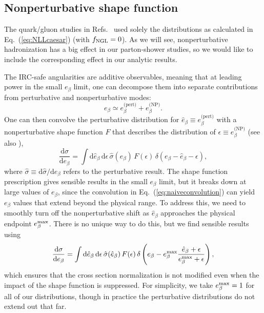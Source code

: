 \documentclass[11pt,letterpaper]{article}
\newcommand{\df}{\text{d}}
\DeclareRobustCommand{\Eq}[1]{Eq.~(\ref{#1})}
\DeclareRobustCommand{\Refs}[1]{Refs.~\cite{#1}}
\newcommand{\be}{\begin{equation}}
\newcommand{\ee}{\end{equation}}
\begin{document}
\subsection{Nonperturbative shape function}
\label{subsec:shapefuncdef}

The quark/gluon studies in \Refs{Larkoski:2013eya,Larkoski:2014pca} used solely the distributions as calculated in \Eq{eq:NLLcaesar} (with $f_{\rm NGL} = 0$).  As we will see, nonperturbative hadronization has a big effect in our parton-shower studies, so we would like to include the corresponding effect in our analytic results.

The IRC-safe angularities are additive observables, meaning that at leading power in the small $e_\beta$ limit, one can decompose them into separate contributions from perturbative and nonperturbative modes:
\be
e_\beta \simeq e_\beta^{\text{(pert)}} + e_\beta^{\text{(NP)}}.
\ee
One can then convolve the perturbative distribution for $\hat{e}_\beta \equiv e_\beta^{\text{(pert)}}$ with a nonperturbative shape function $F$ that describes the distribution of $\epsilon \equiv e_\beta^{\text{(NP)}}$ \cite{Korchemsky:1999kt, Korchemsky:2000kp} (see also \cite{Manohar:1994kq, Dokshitzer:1995zt, Salam:2001bd, Lee:2006nr, Mateu:2012nk}),
\be
\label{eq:naiveconvolution}
\frac{\df \sigma}{\df e_\beta} = \int \df \hat{e}_\beta \, \df \epsilon \,  \hat{\sigma}(\hat{e}_\beta) \, F(\epsilon) \, \delta\left(e_\beta - \hat{e}_\beta - \epsilon\right),
\ee
where $\hat{\sigma} \equiv \df \hat{\sigma}/\df \hat{e}_\beta$ refers to the perturbative result.  The shape function prescription gives sensible results in the small $e_\beta$ limit, but it breaks down at large values of $e_\beta$, since the convolution in \Eq{eq:naiveconvolution} can yield $e_\beta$ values that extend beyond the physical range.  To address this, we need to smoothly turn off the nonperturbative shift as $\hat{e}_\beta$ approaches the physical endpoint $e_\beta^{\rm max}$.  There is no unique way to do this, but we find sensible results using
\be
\label{eq:physicalconvolution}
\frac{\df \sigma}{\df e_\beta} = \int \df \hat{e}_\beta \, \df \epsilon \,   \hat{\sigma}(\hat{e}_\beta) \, F(\epsilon) \, \delta \left(e_\beta - e_\beta^{\rm max} \frac{\hat{e}_\beta + \epsilon}{e_\beta^{\rm max} + \epsilon} \right),
\ee
which ensures that the cross section normalization is not modified even when the impact of the shape function is suppressed.  For simplicity, we take $e_\beta^{\rm max} = 1$ for all of our distributions, though in practice the perturbative distributions do not extend out that far.
\end{document}
